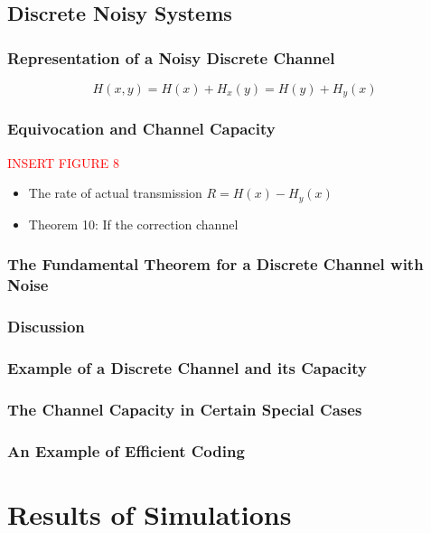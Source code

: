 \documentclass[leqno,twocolumn]{article}
\begin{document}
\subsection{Discrete Noisy Systems}
\subsubsection{Representation of a Noisy Discrete Channel}
\[ H(x,y) = H(x) + H_x(y) = H(y) + H_y(x) \]

\subsubsection{Equivocation and Channel Capacity}
\textcolor{red}{INSERT FIGURE 8}
\begin{itemize}
\item The rate of actual transmission $R = H(x) - H_y(x)$
\item Theorem 10: If the correction channel
\end{itemize}

\subsubsection{The Fundamental Theorem for a Discrete Channel with Noise}

\subsubsection{Discussion}

\subsubsection{Example of a Discrete Channel and its Capacity}

\subsubsection{The Channel Capacity in Certain Special Cases}

\subsubsection{An Example of Efficient Coding}

\onecolumn
\section{Results of Simulations}
\end{document}
